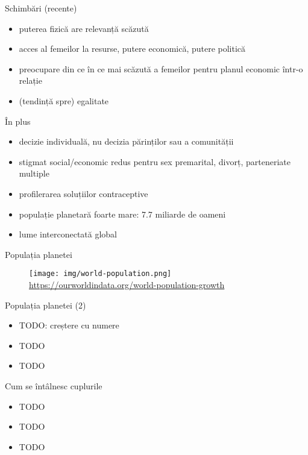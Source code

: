 \documentclass{simple}
\begin{document}
\begin{frame}{Schimbări (recente)}
  \begin{itemize}
    \item puterea fizică are relevanță scăzută
    \item acces al femeilor la resurse, putere economică, putere politică
    \item preocupare din ce în ce mai scăzută a femeilor pentru planul economic într-o relație
    \item (tendință spre) egalitate
  \end{itemize}
\end{frame}

\begin{frame}{În plus}
  \begin{itemize}
    \item decizie individuală, nu decizia părinților sau a comunității
    \item stigmat social/economic redus pentru sex premarital, divorț, parteneriate multiple
    \item profilerarea soluțiilor contraceptive
    \item populație planetară foarte mare: 7.7 miliarde de oameni
    \item lume interconectată global
  \end{itemize}
\end{frame}

\begin{frame}{Populația planetei}
  \begin{figure}[!htbp]
    \centering
    \texttt{[image: img/world-population.png]} \\
    \tiny{\url{https://ourworldindata.org/world-population-growth}}
  \end{figure}
\end{frame}

\begin{frame}{Populația planetei (2)}
  \begin{itemize}
    \item TODO: creștere cu numere
    \item TODO
    \item TODO
  \end{itemize}
\end{frame}

\begin{frame}{Cum se întâlnesc cuplurile}
  \begin{itemize}
    \item TODO
    \item TODO
    \item TODO
  \end{itemize}
\end{frame}
\end{document}
